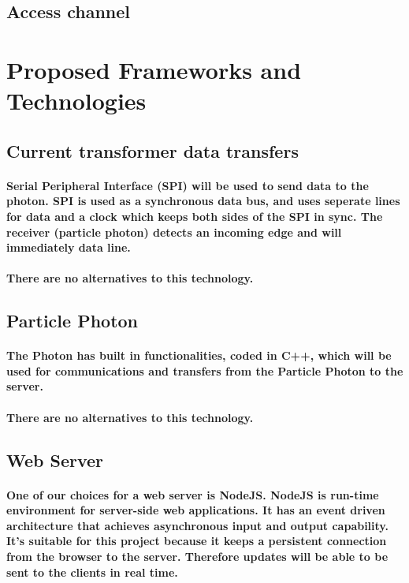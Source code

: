 \documentclass[paper=a4, fontsize=11pt]{scrartcl} %
\begin{document}
	\paragraph{}
	\subsection{Access channel}
	\newpage
	\section{Proposed Frameworks and Technologies}
	\subsection{Current transformer data transfers}
	\paragraph{Serial Peripheral Interface (SPI) will be used to send data to the photon. SPI is used as a synchronous data bus,
	and uses seperate lines for data and a clock which keeps both sides of the SPI in sync. The receiver (particle photon) detects an incoming 
	edge and will immediately data line.}
	\paragraph{There are no alternatives to this technology.}
	\subsection{Particle Photon}
	\paragraph{The Photon has built in functionalities, coded in C++, which will be used for communications and transfers from the Particle Photon to the server.} 
	
	\paragraph{There are no alternatives to this technology.}
	\subsection{Web Server}
	\paragraph{One of our choices for a web server is NodeJS. NodeJS is run-time environment for server-side web applications. It has an event driven
	architecture that achieves asynchronous input and output capability. It's suitable for this project because it keeps a persistent connection
	from the browser to the server. Therefore updates will be able to be sent to the clients in real time.}
\end{document}
